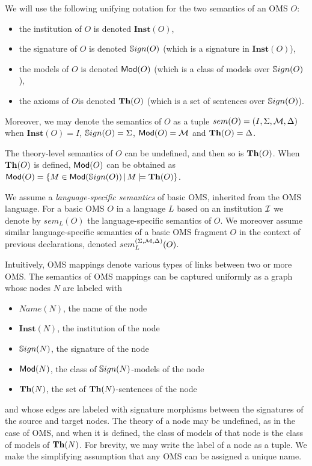 \documentclass[10pt,fleqn,%
\ifpretendfinal
final%
\else
draft%
\fi,
]{scrreprt}
\newcommand{\Inst}{\ensuremath{\mathbf{Inst}}}
\begin{document}
We will use the following unifying notation for the two semantics of an OMS $O$: 
\begin{itemize}
 \item the institution of $O$ is denoted $\Inst(O)$,
  \item the signature of $O$ is denoted $\mathbb{S}ign(O)$ (which is a signature in $\Inst(O)$),
  \item the models of $O$ is denoted $\mathsf{Mod}(O)$ (which is a class of models over $\mathbb{S}ign(O)$),
  \item the axioms of $O$is denoted $\mathbf{Th}(O)$ (which is a set of sentences over $\mathbb{S}ign(O)$).
\end{itemize}
\noindent Moreover, we may denote the semantics of $O$ as a tuple $sem(O) = (I, \Sigma, {\cal M},\Delta)$
when $\Inst(O) = I$, $\mathbb{S}ign(O) = \Sigma$, $\mathsf{Mod}(O) = {\cal M}$ and $\mathbf{Th}(O) = \Delta$.

The theory-level semantics of $O$ can be undefined, and then so is $\mathbf{Th}(O)$. When $\mathbf{Th}(O)$ is defined, $\mathsf{Mod}(O)$ can be obtained as $\mathsf{Mod}(O)=\{M\in\mathsf{Mod}(\mathbb{S}ign(O)) \,|\, M\models\mathbf{Th}(O)\}$.

We assume a \emph{language-specific semantics} of basic 
OMS, inherited from the OMS language. For a basic OMS $O$ in a
language $L$ based on an institution ${\mathcal{I}}$ we denote 
by $sem_L(O)$ the language-specific semantics of $O$.
We moreover assume similar language-specific semantics of a basic OMS fragment $O$ in
the context of previous declarations, denoted $sem^{(\Sigma,{\cal M},\Delta)}_L(O)$.

Intuitively, OMS mappings denote various types of links between two or more OMS. 
The semantics of OMS mappings can be captured uniformly as a graph whose nodes $N$ are labeled with 
\begin{itemize}
 \item $Name(N)$, the name of the node
 \item $\Inst(N)$, the institution of the node
 \item $\mathbb{S}ign(N)$, the signature of the node
 \item $\mathsf{Mod}(N)$, the class of $\mathbb{S}ign(N)$-models of the node
 \item $\mathbf{Th}(N)$, the set of $\mathbf{Th}(N)$-sentences of the node
\end{itemize}
and whose edges are labeled with signature morphisms between the signatures of the source and target nodes. 
The theory of a node  may be undefined, as in the case of OMS, and when it is defined, 
the class of models of that node is the class of models of $\mathbf{Th}(N)$. 
For brevity, we may write the label of a node as a tuple. We make the simplifying 
assumption that any OMS can be assigned a unique name.
\end{document}
